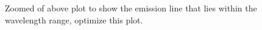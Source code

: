 \documentclass[twocolumn]{aastex6}
\begin{document}
\begin{figure}[ht]
  \centering
  \caption{Zoomed of above plot to show the emission line that lies within the wavelength range, optimize this plot.}
  \label{graphs}
\end{figure}
\end{document}
